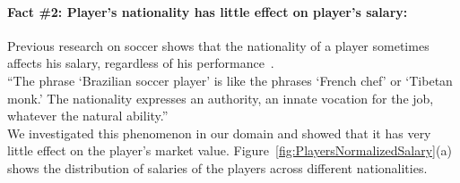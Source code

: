 


\paragraph{Fact \#2: Player's nationality has little effect on player's salary:} Previous research on soccer shows that the nationality of a player sometimes affects his salary, regardless of his performance~\cite{Wooten2013}. \\
``The phrase `Brazilian soccer player' is like the phrases `French chef' or `Tibetan monk.'  The nationality
expresses an authority, an innate vocation for the job, whatever the natural ability.''~\cite{PAPASTERGIADIS2013}\\
We investigated this phenomenon in our domain and showed that it has very little effect on the player's market value. Figure~\ref{fig:PlayersNormalizedSalary}(a) shows the distribution of salaries of the players across different nationalities.
\begin{table}[htbp]
	
	\centering
		\caption{Average salary of players in different teams .\label{table:salariofDifferentTeam}}
	\end{table}

